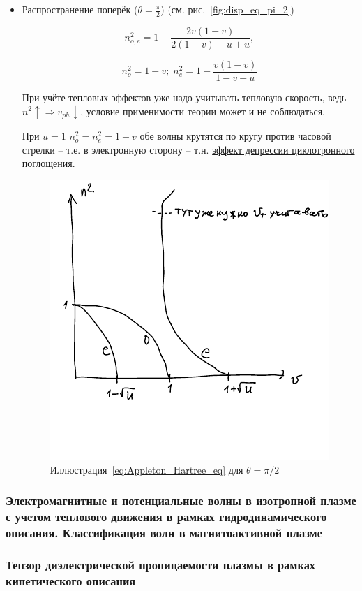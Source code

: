 \documentclass[10pt, a4paper]{article}
\begin{document}
\begin{itemize}
	\item Распространение поперёк ($\theta = \frac{\pi}{2}$) (см. рис.~\eqref{fig:disp_eq_pi_2})
	
	\begin{equation*}
		n_{o,e}^2=1-\frac{2v(1-v)}{2(1-v)-u \pm u}, 
	\end{equation*}

	\begin{equation*}
		n_o^2 = 1-v;\;n_e^2 = 1-\frac{v(1-v)}{1-v-u}
	\end{equation*}
	
	При учёте тепловых эффектов уже надо учитывать тепловую скорость, ведь $n^2\uparrow \Rightarrow v_{ph} \downarrow$, условие применимости теории может и не соблюдаться.
	
	При $u=1$ $n_o^2 = n_e^2 = 1-v$ обе волны крутятся по кругу против часовой стрелки -- т.е. в электронную сторону -- т.н. \uline{эффект депрессии циклотронного поглощения}.
	
	\begin{figure}[ht]
		\begin{center}
			\includegraphics[width=0.35\linewidth]{theta-90.pdf}
		\end{center}
		\caption{Иллюстрация~\eqref{eq:Appleton_Hartree_eq} для $\theta=\pi/2$}		
		\label{fig:disp_eq_pi_2}
	\end{figure}
	
\end{itemize}

\subsubsection{Электромагнитные и потенциальные волны в изотропной плазме с учетом теплового движения в рамках гидродинамического описания. Классификация волн в магнитоактивной плазме}

\subsubsection{Тензор диэлектрической проницаемости плазмы в рамках кинетического описания}
\end{document}
